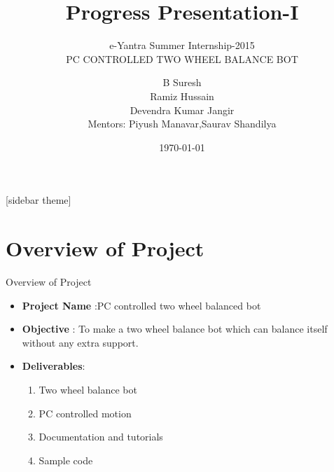 \documentclass[10pt, a4paper]{beamer}
\begin{document}
	\title{Progress Presentation-I}
	\subtitle{e-Yantra Summer Internship-2015 \\ PC CONTROLLED TWO WHEEL BALANCE BOT}
	\author{B Suresh\\Ramiz Hussain\\Devendra Kumar Jangir \\
	Mentors: Piyush Manavar,Saurav Shandilya}
	\date{\today}
	\frame{\titlepage}

[sidebar theme]
\section{Overview of Project}
\begin{frame}{Overview of Project}
	\begin{itemize}
		\item \textbf{Project Name} :PC controlled two wheel balanced bot
		\item \textbf{Objective} : To make a two wheel balance bot which can balance itself without any extra support.
		\item \textbf{Deliverables}: \\
		\begin{enumerate}
			\item Two wheel balance bot
			\item PC controlled motion
			\item Documentation and tutorials
			\item Sample code
		\end{enumerate}
		\end{itemize}
\end{frame}
\end{document}
